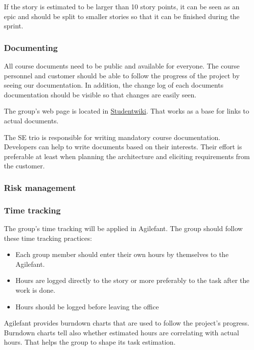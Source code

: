 If the story is estimated to be larger than 10 story points, it can be seen as 
an epic and should be split to smaller stories so that it can be finished 
during the sprint.

\subsubsection{Documenting}

All course documents need to be public and available for everyone. The course 
personnel and customer should be able to follow the progress of the project by 
seeing our documentation. In addition, the change log of each documents 
documentation should be visible so that changes are easily seen.

The group's web page is located in 
\href{https://studentwiki.aalto.fi/display/MOB/Mobilefant+Home}{Studentwiki}. That works as a base for links to actual documents.

The SE trio is responsible for writing mandatory course documentation. 
Developers can help to write documents based on their interests. Their effort 
is preferable at least when planning the architecture and eliciting 
requirements from the customer. 

\subsubsection{Risk management}

\subsubsection{Time tracking}

The group's time tracking will be applied in Agilefant. The group should follow 
these time tracking practices:
\begin{itemize}
\item Each group member should enter their own hours by themselves to the 
Agilefant.
\item Hours are logged directly to the story or more preferably to the task 
after the work is done. 
\item Hours should be logged before leaving the office
\end{itemize}

Agilefant provides burndown charts that are used to follow the project's progress. Burndown charts tell also whether estimated hours are correlating with actual hours. That helps the group to shape its task estimation.

